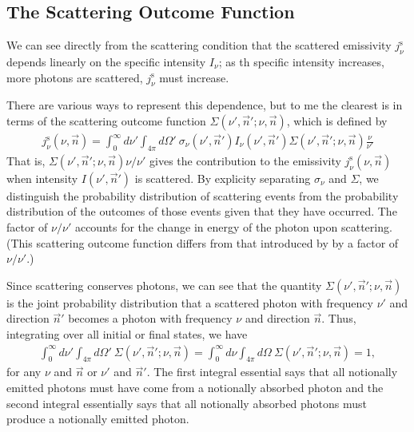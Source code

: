 \subsection{The Scattering Outcome Function}

We can see directly from the scattering condition that the
scattered emissivity $j_\nu^\mathrm{s}$ depends linearly on
the specific intensity $I_\nu$; as th specific intensity
increases, more photons are scattered, $j_\nu^\mathrm{s}$
must increase. 

There are various ways to represent this dependence, but to
me the clearest is in terms of the scattering outcome
function $\Sigma(\nu', \vec n'; \nu, \vec n)$, which is
defined by
\begin{align}
j_\nu^\mathrm{s}(\nu, \vec n) =
\int_0^\infty \!\!\! d\nu' 
\int_{4\pi} \!\!\! d\Omega'
\:
\sigma_\nu(\nu', \vec n')
I_\nu(\nu', \vec n')
\Sigma(\nu', \vec n'; \nu, \vec n)
\frac{\nu}{\nu'}
\end{align}
That is, $\Sigma(\nu', \vec n'; \nu, \vec n)
\nu/\nu'$ gives the contribution to the emissivity
$j_\nu^\mathrm{s}(\nu,
\vec n)$ when
intensity $I(\nu', \vec n')$ is scattered. By explicity
separating $\sigma_\nu$ and $\Sigma$, we distinguish the
probability distribution of scattering events from the
probability distribution of the outcomes of those events
given that they have occurred. The factor of $\nu/\nu'$
accounts for the change in energy of the photon upon
scattering. (This scattering outcome function differs from
that introduced by \citealt{Watson-2001} by a factor of
$\nu/\nu'$.)

Since scattering conserves photons, we can see that the quantity
$\Sigma(\nu', \vec n'; \nu, \vec n)$ is the joint
probability distribution that a scattered photon with
frequency $\nu'$ and direction $\vec n'$ becomes a photon
with frequency $\nu$ and direction $\vec n$. Thus,
integrating over all initial or final states, we have
\begin{align}
\int_0^\infty \!\!\! d\nu'
\int_{4\pi} \!\!\! d\Omega'
\:
\Sigma(\nu', \vec n'; \nu, \vec n)
=
\int_0^\infty \!\!\!\! d\nu
\int_{4\pi} \!\!\!\! d\Omega
\:
\Sigma(\nu', \vec n'; \nu, \vec n)
=
1,
\end{align}
for any $\nu$ and $\vec n$ or $\nu'$ and $\vec n'$. 
The first integral essential says that all notionally
emitted photons must have come from a notionally absorbed
photon and the second integral essentially says that all
notionally absorbed photons must produce a notionally
emitted photon.

